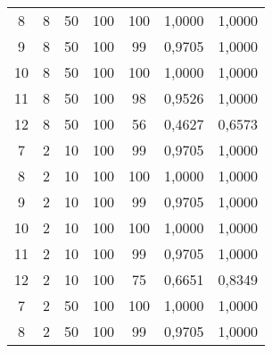 \begin{table}[H]
\begin{tabular}{@{}ccccccc@{}}
8  & 8                                                     & 50                                                        & 100 & 100 & 1,0000        & 1,0000       \\
9  & 8                                                     & 50                                                        & 100 & 99  & 0,9705        & 1,0000       \\
10 & 8                                                     & 50                                                        & 100 & 100 & 1,0000        & 1,0000       \\
11 & 8                                                     & 50                                                        & 100 & 98  & 0,9526        & 1,0000       \\
12 & 8                                                     & 50                                                        & 100 & 56  & 0,4627        & 0,6573       \\
7  & 2                                                     & 10                                                        & 100 & 99  & 0,9705        & 1,0000       \\
8  & 2                                                     & 10                                                        & 100 & 100 & 1,0000        & 1,0000       \\
9  & 2                                                     & 10                                                        & 100 & 99  & 0,9705        & 1,0000       \\
10 & 2                                                     & 10                                                        & 100 & 100 & 1,0000        & 1,0000       \\
11 & 2                                                     & 10                                                        & 100 & 99  & 0,9705        & 1,0000       \\
12 & 2                                                     & 10                                                        & 100 & 75  & 0,6651        & 0,8349       \\
7  & 2                                                     & 50                                                        & 100 & 100 & 1,0000        & 1,0000       \\
8  & 2                                                     & 50                                                        & 100 & 99  & 0,9705        & 1,0000       \\

\end{tabular}
\end{table}
